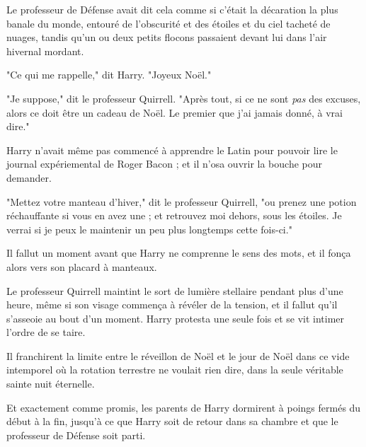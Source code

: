 Le professeur de Défense avait dit cela comme si c'était la décaration la plus banale du monde, entouré de l'obscurité et des étoiles et du ciel tacheté de nuages, tandis qu'un ou deux petits flocons passaient devant lui dans l'air hivernal mordant.

"Ce qui me rappelle," dit Harry. "Joyeux Noël."

"Je suppose," dit le professeur Quirrell. "Après tout, si ce ne sont \emph{pas}  des excuses, alors ce doit être un cadeau de Noël. Le premier que j'ai jamais donné, à vrai dire."

Harry n'avait même pas commencé à apprendre le Latin pour pouvoir lire le journal expériemental de Roger Bacon ; et il n'osa ouvrir la bouche pour demander.

"Mettez votre manteau d'hiver," dit le professeur Quirrell, "ou prenez une potion réchauffante si vous en avez une ; et retrouvez moi dehors, sous les étoiles. Je verrai si je peux le maintenir un peu plus longtemps cette fois-ci."

Il fallut un moment avant que Harry ne comprenne le sens des mots, et il fonça alors vers son placard à manteaux.

Le professeur Quirrell maintint le sort de lumière stellaire pendant plus d'une heure, même si son visage commença à révéler de la tension, et il fallut qu'il s'asseoie au bout d'un moment. Harry protesta une seule fois et se vit intimer l'ordre de se taire.

Il franchirent la limite entre le réveillon de Noël et le jour de Noël dans ce vide intemporel où la rotation terrestre ne voulait rien dire, dans la seule véritable sainte nuit éternelle.

Et exactement comme promis, les parents de Harry dormirent à poings fermés du début à la fin, jusqu'à ce que Harry soit de retour dans sa chambre et que le professeur de Défense soit parti.

